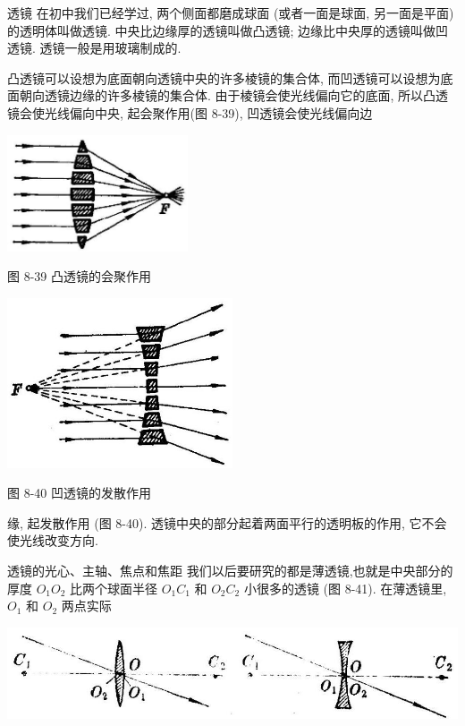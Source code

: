 \documentclass[10pt]{article}
\begin{document}
透镜 在初中我们已经学过, 两个侧面都磨成球面 (或者一面是球面, 另一面是平面) 的透明体叫做透镜. 中央比边缘厚的透镜叫做凸透镜; 边缘比中央厚的透镜叫做凹透镜. 透镜一般是用玻璃制成的.

凸透镜可以设想为底面朝向透镜中央的许多棱镜的集合体, 而凹透镜可以设想为底面朝向透镜边缘的许多棱镜的集合体. 由于棱镜会使光线偏向它的底面, 所以凸透镜会使光线偏向中央, 起会聚作用(图 8-39), 凹透镜会使光线偏向边

\begin{center}
\includegraphics[max width=0.4\textwidth]{images/01913056-1f15-74d8-9184-9aab52c9d66b_274_173848.jpg}
\end{center}

图 8-39 凸透镜的会聚作用

\begin{center}
\includegraphics[max width=0.5\textwidth]{images/01913056-1f15-74d8-9184-9aab52c9d66b_274_924497.jpg}
\end{center}

图 8-40 凹透镜的发散作用

缘, 起发散作用 (图 8-40). 透镜中央的部分起着两面平行的透明板的作用, 它不会使光线改变方向.

透镜的光心、主轴、焦点和焦距 我们以后要研究的都是薄透镜,也就是中央部分的厚度 \({O}_{1}{O}_{2}\) 比两个球面半径 \({O}_{1}{C}_{1}\) 和 \({O}_{2}{C}_{2}\) 小很多的透镜 (图 8-41). 在薄透镜里, \({O}_{1}\) 和 \({O}_{2}\) 两点实际

\begin{center}
\includegraphics[max width=1.0\textwidth]{images/01913056-1f15-74d8-9184-9aab52c9d66b_275_209273.jpg}
\end{center}
\end{document}
